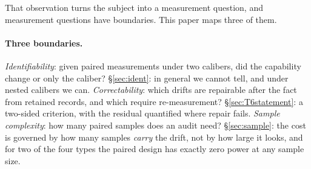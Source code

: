 \documentclass{article}
\begin{document}
That observation turns the subject into a measurement question, and measurement questions have boundaries.
This paper maps three of them.

\paragraph{Three boundaries.} \emph{Identifiability}: given paired measurements under two calibers, did the
capability change or only the caliber? \S\ref{sec:ident}: in general we cannot tell, and under nested
calibers we can. \emph{Correctability}: which drifts are repairable after the fact from retained records, and
which require re-measurement? \S\ref{sec:T6statement}: a two-sided criterion, with the residual quantified
where repair fails. \emph{Sample complexity}: how many paired samples does an audit need?
\S\ref{sec:sample}: the cost is governed by how many samples \emph{carry} the drift, not by how large it
looks, and for two of the four types the paired design has exactly zero power at any sample size.
\end{document}
